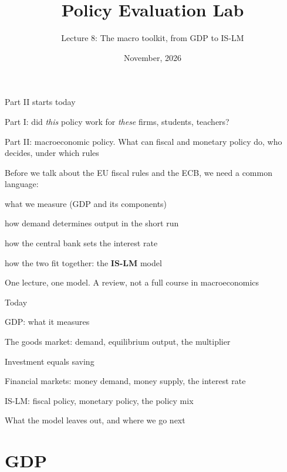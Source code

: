 \documentclass[aspectratio=169,xcolor=table]{beamer}
\title[Policy Evaluation Lab]{Policy Evaluation Lab}
\subtitle[Lecture 8]{Lecture 8: The macro toolkit, from GDP to IS-LM}
\date[\pelYear]{November, 2026}
\begin{document}
\frame{\titlepage}

\begin{frame}{Part II starts today}
\small
\bi
  \item Part I: did \emph{this} policy work for \emph{these} firms, students, teachers?
  \item Part II: macroeconomic policy. What can fiscal and monetary policy do, who decides, under which rules
  \item Before we talk about the EU fiscal rules and the ECB, we need a common language:
  \bi
    \item what we measure (GDP and its components)
    \item how demand determines output in the short run
    \item how the central bank sets the interest rate
    \item how the two fit together: the \textbf{IS-LM} model
  \ei
\ei
\vspace{0.2cm}
\begin{block}{}
\centering One lecture, one model. A review, not a full course in macroeconomics
\end{block}
\end{frame}

\begin{frame}{Today}
\be
  \item GDP: what it measures
  \item The goods market: demand, equilibrium output, the multiplier
  \item Investment equals saving
  \item Financial markets: money demand, money supply, the interest rate
  \item IS-LM: fiscal policy, monetary policy, the policy mix
  \item What the model leaves out, and where we go next
\ee
\end{frame}

\section{GDP}
\end{document}
